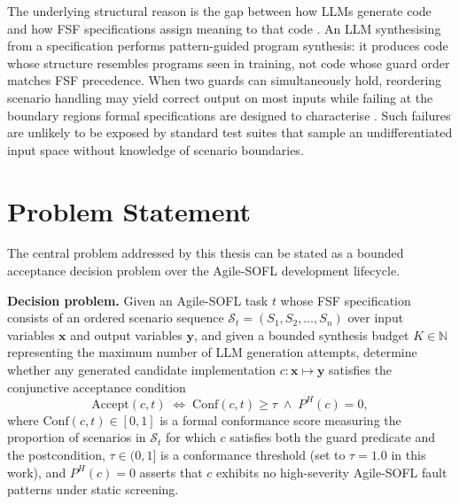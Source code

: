 The underlying structural reason is the gap between how LLMs generate code and how FSF specifications assign meaning to that code \citep{dijkstra1975guarded, lynn2024verifierloop}.  An LLM synthesising from a specification performs pattern-guided program synthesis: it produces code whose structure resembles programs seen in training, not code whose guard order matches FSF precedence.  When two guards can simultaneously hold, reordering scenario handling may yield correct output on most inputs while failing at the boundary regions formal specifications are designed to characterise \citep{zhu1997specification}.  Such failures are unlikely to be exposed by standard test suites that sample an undifferentiated input space without knowledge of scenario boundaries.


\section{Problem Statement}
\label{sec:intro:problem}

The central problem addressed by this thesis can be stated as a bounded acceptance decision problem over the Agile-SOFL development lifecycle.

\medskip
\noindent\textbf{Decision problem.}
Given an Agile-SOFL task $t$ whose FSF specification consists of an ordered scenario sequence $\mathcal{S}_t = (S_1, S_2, \ldots, S_n)$ over input variables $\mathbf{x}$ and output variables $\mathbf{y}$, and given a bounded synthesis budget $K \in \mathbb{N}$ representing the maximum number of LLM generation attempts, determine whether any generated candidate implementation $c : \mathbf{x} \mapsto \mathbf{y}$ satisfies the conjunctive acceptance condition
\begin{equation}
  \mathrm{Accept}(c, t)
  \;\iff\;
  \mathrm{Conf}(c, t) \geq \tau
  \;\wedge\;
  P^H(c) = 0,
  \label{eq:acceptance}
\end{equation}
where $\mathrm{Conf}(c, t) \in [0, 1]$ is a formal conformance score measuring the proportion of scenarios in $\mathcal{S}_t$ for which $c$ satisfies both the guard predicate and the postcondition, $\tau \in (0, 1]$ is a conformance threshold (set to $\tau = 1.0$ in this work), and $P^H(c) = 0$ asserts that $c$ exhibits no high-severity Agile-SOFL fault patterns under static screening.


